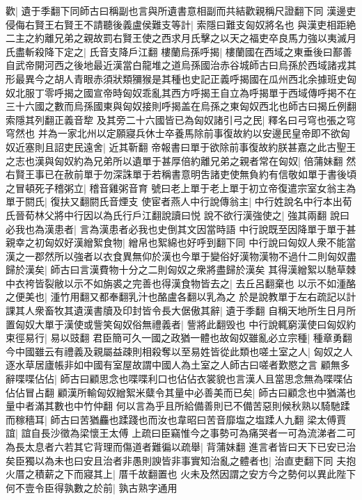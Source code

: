 歡|{
	遺于季翻下同師古曰稱副也言與所遺書意相副而共結歡親稱尺證翻下同}
漢邊吏侵侮右賢王右賢王不請聽後義盧侯難支等計|{
	索隱曰難支匈奴將名也}
與漢吏相距絶二主之約離兄弟之親故罰右賢王使之西求月氏擊之以天之福吏卒良馬力強以夷滅月氏盡斬殺降下定之|{
	氏音支降戶江翻}
樓蘭烏孫呼揭|{
	樓蘭國在西域之東垂後曰鄯善自武帝開河西之後地最近漢當白龍堆之道烏孫國治赤谷城師古曰烏孫於西域諸戎其形最異今之胡人青眼赤須狀類獼猴是其種也史記正義呼揭國在瓜州西北余據班史匈奴北服丁零呼揭之國宣帝時匈奴乖亂其西方呼揭王自立為呼揭單于西域傳呼掲不在三十六國之數而烏孫國東與匈奴接則呼揭盖在烏孫之東匈奴西北也師古曰揭丘例翻索隱其列翻正義音犂}
及其旁二十六國皆已為匈奴諸引弓之民|{
	釋名曰弓穹也張之穹穹然也}
并為一家北州以定願寢兵休士卒養馬除前事復故約以安邊民皇帝即不欲匈奴近塞則且詔吏民遠舍|{
	近其靳翻}
帝報書曰單于欲除前事復故約朕甚嘉之此古聖王之志也漢與匈奴約為兄弟所以遺單于甚厚倍約離兄弟之親者常在匈奴|{
	倍蒲妹翻}
然右賢王事已在赦前單于勿深誅單于若稱書意明吿諸吏使無負約有信敬如單于書後頃之冒頓死子稽粥立|{
	稽音雞粥音育}
號曰老上單于老上單于初立帝復遣宗室女翁主為單于閼氏|{
	復扶又翻閼氏音煙支}
使宦者燕人中行說傳翁主|{
	中行姓說名中行本出荀氏晉荀林父將中行因以為氏行戶江翻說讀曰悦}
說不欲行漢強使之|{
	強其兩翻}
說曰必我也為漢患者|{
	言為漢患者必我也史倒其文因當時語}
中行說既至因降單于單于甚親幸之初匈奴好漢繒絮食物|{
	繒帛也絮綿也好呼到翻下同}
中行說曰匈奴人衆不能當漢之一郡然所以強者以衣食異無仰於漢也今單于變俗好漢物漢物不過什二則匈奴盡歸於漢矣|{
	師古曰言漢費物十分之二則匈奴之衆將盡歸於漢矣}
其得漢繒絮以馳草棘中衣袴皆裂敝以示不如旃裘之完善也得漢食物皆去之|{
	去丘呂翻棄也}
以示不如湩酪之便美也|{
	湩竹用翻又都奉翻乳汁也酪盧各翻以乳為之}
於是說教單于左右疏記以計課其人衆畜牧其遺漢書牘及印封皆令長大倨傲其辭|{
	遺于季翻}
自稱天地所生日月所置匈奴大單于漢使或訾笑匈奴俗無禮義者|{
	訾將此翻毁也}
中行說輒窮漢使曰匈奴約束徑易行|{
	易以豉翻}
君臣簡可久一國之政猶一體也故匈奴雖亂必立宗種|{
	種章勇翻}
今中國雖云有禮義及親屬益疎則相殺奪以至易姓皆從此類也嗟土室之人|{
	匈奴之人逐水草居廬帳非如中國有室屋故謂中國人為土室之人師古曰嗟者歎愍之言}
顧無多辭喋喋佔佔|{
	師古曰顧思念也喋喋利口也佔佔衣裳貌也言漢人且當思念無為喋喋佔佔佔冒占翻}
顧漢所輸匈奴繒絮米糵令其量中必善美而已矣|{
	師古曰顧念也中猶滿也量中者滿其數也中竹仲翻}
何以言為乎且所給備善則已不備苦惡則候秋熟以騎馳蹂而稼穡耳|{
	師古曰苦猶麤也蹂踐也而汝也韋昭曰苦音靡塩之塩蹂人九翻}
梁太傅賈誼|{
	誼自長沙徵為梁懷王太傅}
上疏曰臣竊惟今之事勢可為痛哭者一可為流涕者二可為長太息者六若其它背理而傷道者難徧以疏舉|{
	背蒲妹翻}
進言者皆曰天下已安已治矣臣獨以為未也曰安且治者非愚則諛皆非事實知治亂之體者也|{
	治直吏翻下同}
夫抱火厝之積薪之下而寢其上|{
	厝千故翻置也}
火未及然因謂之安方今之勢何以異此陛下何不壹令臣得孰數之於前|{
	孰古熟字通用}
